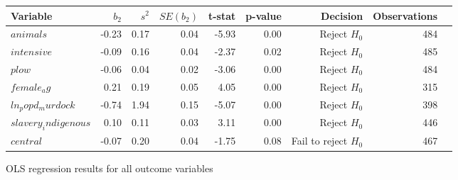 \centering
\begin{tabular}{lrrrrrrrl}
\hline
Variable & $b_2$ & $s^2$ & $SE(b_2)$ & t-stat & p-value & Decision & Observations \\
\hline
$animals$ & -0.23 & 0.17 & 0.04 & -5.93 & 0.00 & Reject $H_0$ & 484\\
$intensive$ & -0.09 & 0.16 & 0.04 & -2.37 & 0.02 & Reject $H_0$ & 485\\
$plow$ & -0.06 & 0.04 & 0.02 & -3.06 & 0.00 & Reject $H_0$ & 484\\
$female_ag$ & 0.21 & 0.19 & 0.05 & 4.05 & 0.00 & Reject $H_0$ & 315\\
$ln_popd_murdock$ & -0.74 & 1.94 & 0.15 & -5.07 & 0.00 & Reject $H_0$ & 398\\
$slavery_indigenous$ & 0.10 & 0.11 & 0.03 & 3.11 & 0.00 & Reject $H_0$ & 446\\
$central$ & -0.07 & 0.20 & 0.04 & -1.75 & 0.08 & Fail to reject $H_0$ & 467\\
\hline
\end{tabular}
\caption{OLS regression results for all outcome variables}
\label{tab:regression_results}
